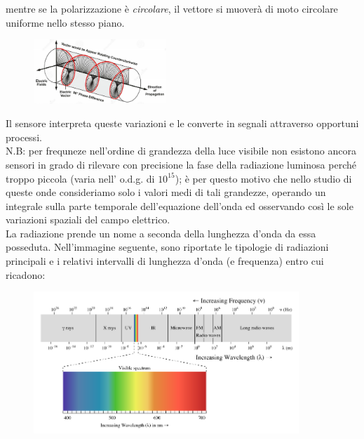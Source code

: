 \documentclass[a4paper,11pt]{article}
\begin{document}
mentre se la polarizzazione è \textit{circolare}, il vettore si muoverà di moto circolare uniforme nello stesso piano. 

\begin{figure}[h!!]
    \centering
    \includegraphics[width=5cm]{pol circ.jpg}
    \label{fig:my_label2}
\end{figure}

Il sensore interpreta queste variazioni e le converte in segnali attraverso opportuni processi. \bigskip\\


N.B: per frequneze nell'ordine di grandezza della luce visibile non esistono ancora sensori in grado di rilevare con precisione la fase della radiazione luminosa perché troppo piccola (varia nell' o.d.g. di \(10^{15}\)); è per questo motivo che nello studio di queste onde consideriamo solo i valori medi di tali grandezze, operando un integrale sulla parte temporale dell'equazione dell'onda ed osservando così le sole variazioni spaziali del campo elettrico.\smallskip\\

La radiazione prende un nome a seconda della lunghezza d'onda da essa posseduta. Nell'immagine seguente, sono riportate le tipologie di radiazioni principali e i relativi intervalli di lunghezza d'onda (e frequenza) entro cui ricadono: 
\begin{figure}[h!!]
    \centering
    \includegraphics[width=10cm]{spettro em.png}
    \label{fig:my_label3}
\end{figure}
\end{document}
